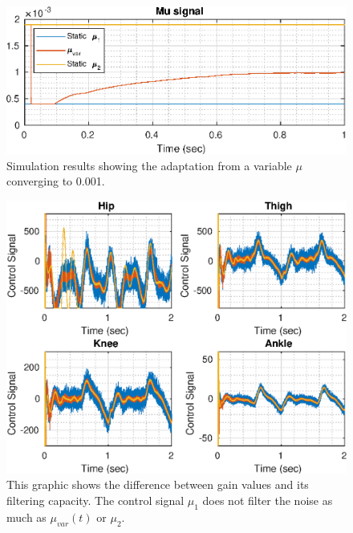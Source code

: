 \documentclass[letterpaper, 10 pt, conference]{ieeeconf}  %
\theoremstyle{plain}
\theoremstyle{definition}
\theoremstyle{remark}
\begin{document}
%
\begin{figure}[]
	\begin{center}
	\includegraphics[width = \columnwidth]{Figs/mu_comparison.eps}
	\caption{Simulation results showing the adaptation from a variable $\mu$ converging to 0.001.}
	\label{fig:mu_comparison}
	\end{center}
\end{figure}
%
%
\begin{figure}[]
	\begin{center}
	\includegraphics[width = \columnwidth]{Figs/u_comparison.eps}
	\caption{This graphic shows the difference between gain values and its filtering capacity. The control signal $\mu_1$ does not filter the noise as much as $\mu_{var}(t)$ or $\mu_2$.}
	\label{fig:u_comparison}
	\end{center}
\end{figure}
%
%
\end{document}
